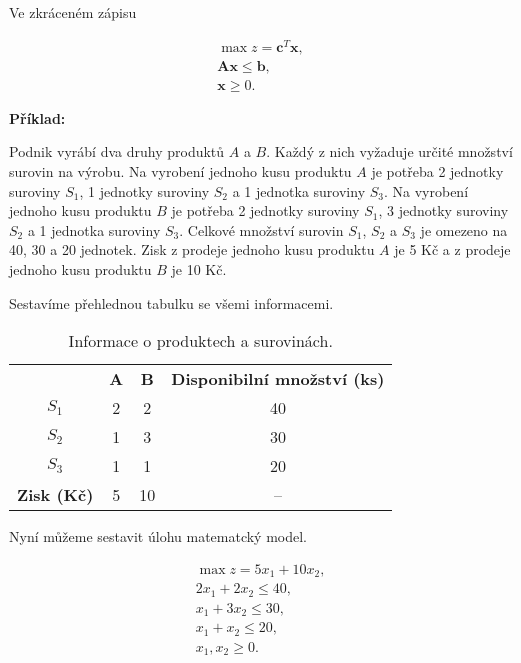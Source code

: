 Ve zkráceném zápisu

\begin{equation}
    \begin{gathered}
        \max z = \bm{c}^T\bm{x}, \\
        \bm{A}\bm{x} \leq \bm{b}, \\
        \bm{x} \geq 0.
    \end{gathered}
\end{equation}

\textbf{Příklad:}

Podnik vyrábí dva druhy produktů $A$ a $B$. Každý z nich vyžaduje určité množství surovin na výrobu.
Na vyrobení jednoho kusu produktu $A$ je potřeba 2 jednotky suroviny $S_1$, 1 jednotky suroviny $S_2$ a 1 jednotka suroviny $S_3$.
Na vyrobení jednoho kusu produktu $B$ je potřeba 2 jednotky suroviny $S_1$, 3 jednotky suroviny $S_2$ a 1 jednotka suroviny $S_3$.
Celkové množství surovin $S_1$, $S_2$ a $S_3$ je omezeno na 40, 30 a 20 jednotek.
Zisk z prodeje jednoho kusu produktu $A$ je 5 Kč a z prodeje jednoho kusu produktu $B$ je 10 Kč.

Sestavíme přehlednou tabulku se všemi informacemi.

\begin{table}[H]
    \centering
    \begin{tabular}{|c|c|c|c|}
        \hline
        \textbf{} & \textbf{A} & \textbf{B} & \textbf{Disponibilní množství (ks)}\\
        \hhline{|=|=|=|=|}
        $S_1$ & 2 & 2 & 40 \\
        \hline
        $S_2$ & 1 & 3 & 30 \\
        \hline
        $S_3$ & 1 & 1 & 20 \\
        \hhline{|=|=|=|=|}
        \textbf{Zisk (Kč)} & 5 & 10 & -- \\
        \hline
    \end{tabular}
    \caption{Informace o produktech a surovinách.}
    \label{tab:vyroba}
\end{table}

Nyní můžeme sestavit úlohu matematcký model.

\begin{equation}
    \begin{gathered}
        \max z = 5x_1 + 10x_2, \\
        2x_1 + 2x_2 \leq 40, \\
        x_1 + 3x_2 \leq 30, \\
        x_1 + x_2 \leq 20, \\
        x_1, x_2 \geq 0.
    \end{gathered}
\end{equation}

